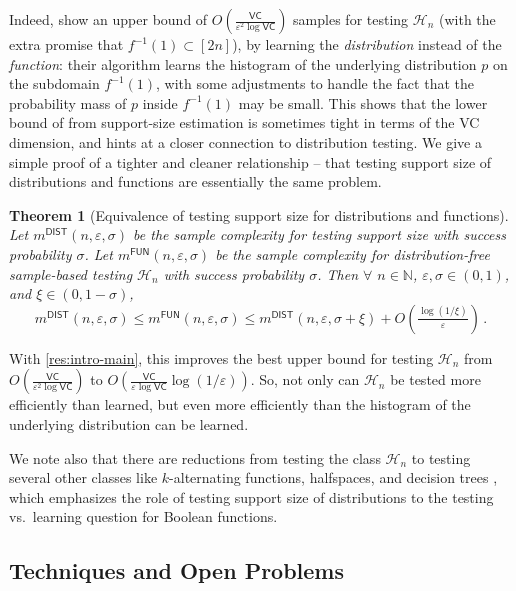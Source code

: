 \documentclass[10pt,a4paper]{article}
\newtheorem{theorem}{Theorem}[section]
\newcommand{\cH}{\ensuremath{\mathcal{H}}}
\newcommand{\bN}{\ensuremath{\mathbb{N}}}
\newcommand{\successprob}{\sigma}
\newcommand{\VC}{\mathsf{VC}}
\newcommand{\DIST}{\mathsf{DIST}}
\newcommand{\FUN}{\mathsf{FUN}}
\renewcommand{\epsilon}{\varepsilon}
\begin{document}
Indeed, \cite{GR16} show an upper bound of $O(\tfrac{\VC}{\epsilon^2 \log \VC})$ samples for testing
$\cH_n$ (with the extra promise that $f^{-1}(1) \subset [2n]$), by learning the \emph{distribution}
instead of the \emph{function}: their algorithm learns the histogram of the underlying
distribution $p$ on the subdomain $f^{-1}(1)$, with some adjustments to handle the fact that the
probability mass of $p$ inside $f^{-1}(1)$ may be small. This shows that the lower bound of
\cite{BFH21} from support-size estimation is sometimes tight in terms of the VC dimension, and hints
at a closer connection to distribution testing.  We give a simple proof of a tighter and cleaner
relationship -- that testing support size of distributions and functions are essentially the same
problem.

\begin{theorem}[Equivalence of testing support size for distributions and functions]
\label{res:intro-functions}
Let $m^\DIST(n,\epsilon,\successprob)$ be the sample
complexity for testing support size with success probability $\successprob$.
Let $m^\FUN(n,\epsilon, \successprob)$ be
the sample complexity for distribution-free sample-based testing $\cH_n$ with success
probability $\successprob$.
Then $\forall$ $n \in \bN$, $\epsilon, \successprob \in (0,1)$, and $\xi \in (0, 1-\successprob)$,
\[
  m^\DIST(n,\epsilon,\successprob) \leq m^\FUN(n,\epsilon,\successprob)
  \leq m^\DIST(n,\epsilon,\successprob+\xi) + O\left(\tfrac{\log(1/\xi)}{\epsilon}\right) \,.
\]
\end{theorem}

With \cref{res:intro-main}, this improves the best upper bound for testing $\cH_n$ from
$O(\tfrac{\VC}{\epsilon^2 \log \VC})$ \cite{GR16} to $O(\tfrac{\VC}{\epsilon \log \VC}
\log(1/\epsilon))$. So, not only can $\cH_n$ be tested more efficiently than learned, but
even more efficiently than the histogram of the
underlying distribution can be learned.


We note also that there are reductions from testing the class $\cH_n$ to testing several other
classes like $k$-alternating functions, halfspaces, and decision trees \cite{BFH21,FH23}, which
emphasizes the role of testing support size of distributions to the testing vs.~learning question
for Boolean functions.

\subsection{Techniques and Open Problems}
\end{document}
